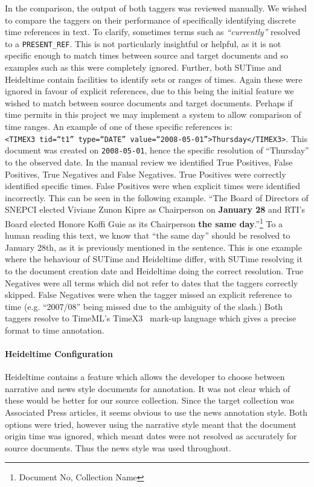 \documentclass{mprop}
\newcommand{\code}[1]{\texttt{#1}}
\let\oldcite=\cite
\renewcommand\cite[1]{\ifthenelse{\equal{#1}{NEEDED}}{\ensuremath{^\texttt{[citation~needed]}}}{\oldcite{#1}}}
\begin{document}
In the comparison, the output of both taggers was reviewed manually. We wished to compare the taggers on their performance of specifically identifying discrete time references in text. To clarify, sometimes terms such as \textit{``currently''} resolved to a \code{PRESENT\_REF}. This is not particularly insightful or helpful, as it is not specific enough to match times between source and target documents and so examples such as this were completely ignored. Further, both SUTime and Heideltime contain facilities to identify sets or ranges of times. Again these were ignored in favour of explicit references, due to this being the initial feature we wished to match between source documents and target documents. Perhaps if time permits in this project we may implement a system to allow comparison of time ranges. An example of one of these specific references is: 
\\ \code{<TIMEX3 tid=``t1'' type=``DATE'' value=``2008-05-01''>Thursday</TIMEX3>}.
This document was created on \code{2008-05-01}, hence the specific resolution of ``Thursday'' to the observed date.
In the manual review we identified True Positives, False Positives, True Negatives and False Negatives. True Positives were correctly identified specific times. False Positives were when explicit times were identified incorrectly. This can be seen in the following example. ``The Board of Directors of SNEPCI elected Viviane Zunon Kipre as Chairperson on \textbf{January 28} and RTI's Board elected Honore Koffi Guie as its Chairperson \textbf{the same day}.''\footnote{Document No, Collection Name} To a human reading this text, we know that ``the same day'' should be resolved to January 28th, as it is previously mentioned in the sentence. This is one example where the behaviour of SUTime and Heideltime differ, with SUTime resolving it to the document creation date and Heideltime doing the correct resolution. True Negatives were all terms which did not refer to dates that the taggers correctly skipped. False Negatives were when the tagger missed an explicit reference to time (e.g. ``2007/08'' being missed due to the ambiguity of the slash.)
Both taggers resolve to TimeML's TimeX3~\cite{timeml} mark-up language which gives a precise format to time annotation.

\paragraph{Heideltime Configuration}
Heideltime contains a feature which allows the developer to choose between narrative and news style documents for annotation. It was not clear which of these would be better for our source collection. Since the target collection was Associated Press articles, it seems obvious to use the news annotation style. Both options were tried, however using the narrative style meant that the document origin time was ignored, which meant dates were not resolved as accurately for source documents. Thus the news style was used throughout.
\end{document}
